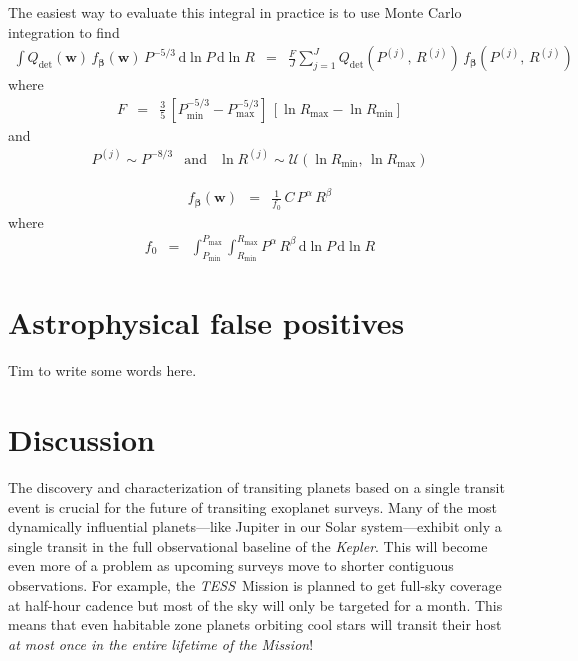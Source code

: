 \documentclass[onecolumn]{aastex6}
\newcommand{\project}[1]{\textsl{#1}}
\newcommand{\kepler}{\project{Kepler}}
\newcommand{\tess}{\project{TESS}}
\newcommand{\sectlabel}[1]{\label{sect:#1}}
\newcommand{\dd}{\ensuremath{\,\mathrm{d}}}
\newcommand{\bvec}[1]{{\ensuremath{\boldsymbol{#1}}}}
\newcommand{\params}{{\ensuremath{\bvec{w}}}}
\newcommand{\poppars}{{\ensuremath{\bvec{\beta}}}}
\begin{document}
The easiest way to evaluate this integral in practice is to use Monte Carlo
integration to find
\begin{eqnarray}
\int Q_{\mathrm{det}}(\params)\,f_\poppars(\params)\,P^{-5/3}\dd\ln P\dd\ln R
&=& \frac{F}{J}\sum_{j=1}^J Q_{\mathrm{det}}(P^{(j)},\,R^{(j)})\,
        f_\poppars(P^{(j)},\,R^{(j)})
\end{eqnarray}
where
\begin{eqnarray}
F &=& \frac{3}{5}\,[P_\mathrm{min}^{-5/3}-P_\mathrm{max}^{-5/3}]\,
      [\ln R_\mathrm{max} - \ln R_\mathrm{min}]
\end{eqnarray}
and
\begin{eqnarray}
P^{(j)} \sim P^{-8/3} &\mathrm{and}&
\ln R^{(j)} \sim \mathcal{U}(\ln R_\mathrm{min},\,\ln R_\mathrm{max})
\end{eqnarray}


\begin{eqnarray}
f_\poppars (\params) &=& \frac{1}{f_0}\,C\,P^\alpha\,R^\beta
\end{eqnarray}
where
\begin{eqnarray}
f_0 &=&
    \int_{P_\mathrm{min}}^{P_\mathrm{max}}
    \int_{R_\mathrm{min}}^{R_\mathrm{max}}
    P^\alpha\,R^\beta\dd\ln P\dd\ln R
\end{eqnarray}


\section{Astrophysical false positives}

Tim to write some words here.



\section{Discussion}\sectlabel{discussion}

The discovery and characterization of transiting planets based on a single
transit event is crucial for the future of transiting exoplanet surveys.
Many of the most dynamically influential planets---like Jupiter in our Solar
system---exhibit only a single transit in the full observational baseline of
the \kepler.
This will become even more of a problem as upcoming surveys move to shorter
contiguous observations.
For example, the \tess\ Mission is planned to get full-sky coverage at
half-hour cadence but most of the sky will only be targeted for a month.
This means that even habitable zone planets orbiting cool stars will transit
their host \emph{at most once in the entire lifetime of the Mission}!
\end{document}
